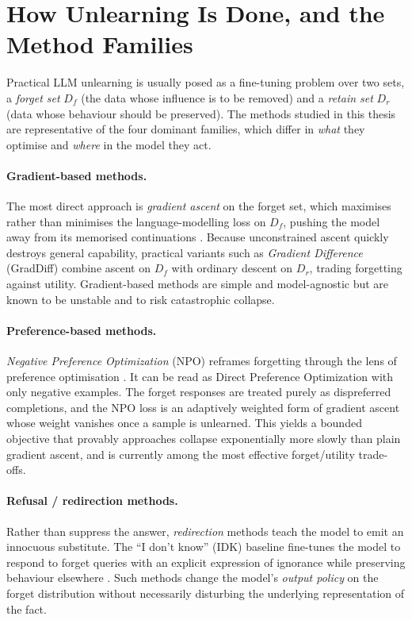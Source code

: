 \section{How Unlearning Is Done, and the Method Families}
\label{sec:method-families}

Practical LLM unlearning is usually posed as a fine-tuning problem over two sets, a \emph{forget set}
\(D_f\) (the data whose influence is to be removed) and a \emph{retain set} \(D_r\) (data whose behaviour
should be preserved). The methods studied in this thesis are representative of the four dominant families,
which differ in \emph{what} they optimise and \emph{where} in the model they act.

\paragraph{Gradient-based methods.}
The most direct approach is \emph{gradient ascent} on the forget set, which maximises rather than minimises
the language-modelling loss on \(D_f\), pushing the model away from its memorised continuations
\citep{jang2022knowledge,yao2023llmunlearning}. Because unconstrained ascent quickly destroys general
capability, practical variants such as \emph{Gradient Difference} (GradDiff) combine ascent on \(D_f\) with
ordinary descent on \(D_r\), trading forgetting against utility. Gradient-based methods are simple and
model-agnostic but are known to be unstable and to risk catastrophic collapse.

\paragraph{Preference-based methods.}
\emph{Negative Preference Optimization} (NPO) reframes forgetting through the lens of preference
optimisation \citep{zhang2024npo}. It can be read as Direct Preference Optimization
\citep{rafailov2023dpo} with only negative examples. The forget responses are treated purely as dispreferred
completions, and the NPO loss is an adaptively weighted form of gradient ascent whose weight vanishes once a
sample is unlearned. This yields a bounded objective that provably approaches collapse exponentially more
slowly than plain gradient ascent, and is currently among the most effective forget/utility trade-offs.

\paragraph{Refusal / redirection methods.}
Rather than suppress the answer, \emph{redirection} methods teach the model to emit an innocuous
substitute. The ``I don't know'' (IDK) baseline fine-tunes the model to respond to forget queries with an
explicit expression of ignorance while preserving behaviour elsewhere \citep{maini2024tofu}. Such methods
change the model's \emph{output policy} on the forget distribution without necessarily disturbing the
underlying representation of the fact.

